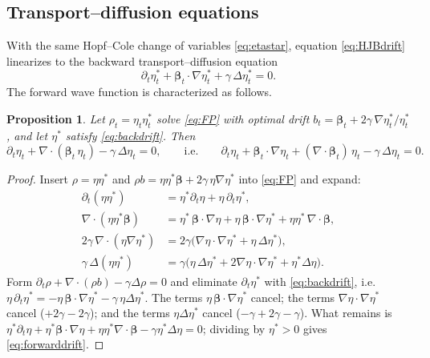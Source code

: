 \documentclass[11pt]{article}
\newtheorem{proposition}{Proposition}
\theoremstyle{remark}
\newcommand{\bt}{\boldsymbol{\beta}}
\newcommand{\grad}{\nabla}
\newcommand{\dive}{\grad\!\cdot\!}
\begin{document}
\subsection{Transport--diffusion equations}
With the same Hopf--Cole change of variables \eqref{eq:etastar}, equation
\eqref{eq:HJBdrift} linearizes to the backward transport--diffusion equation
\begin{equation}
\label{eq:backdrift}
\partial_t\eta^\ast_t+\bt_t\cdot\grad\eta^\ast_t+\gamma\,\Delta\eta^\ast_t=0 .
\end{equation}
The forward wave function is characterized as follows.

\begin{proposition}
\label{prop:forward}
Let $\rho_t=\eta_t\eta^\ast_t$ solve \eqref{eq:FP} with optimal drift
$b_t=\bt_t+2\gamma\,\grad\eta^\ast_t/\eta^\ast_t$, and let $\eta^\ast$ satisfy
\eqref{eq:backdrift}. Then
\begin{equation}
\label{eq:forwarddrift}
\partial_t\eta_t+\dive(\bt_t\,\eta_t)-\gamma\,\Delta\eta_t=0,
\qquad\text{i.e.}\qquad
\partial_t\eta_t+\bt_t\cdot\grad\eta_t+(\dive\bt_t)\,\eta_t-\gamma\,\Delta\eta_t=0 .
\end{equation}
\end{proposition}

\begin{proof}
Insert $\rho=\eta\eta^\ast$ and $\rho b=\eta\eta^\ast\bt+2\gamma\,\eta\grad\eta^\ast$
into \eqref{eq:FP} and expand:
\begin{align*}
\partial_t(\eta\eta^\ast)&=\eta^\ast\partial_t\eta+\eta\,\partial_t\eta^\ast,\\
\dive(\eta\eta^\ast\bt)&=\eta^\ast\,\bt\cdot\grad\eta+\eta\,\bt\cdot\grad\eta^\ast+\eta\eta^\ast\,\dive\bt,\\
2\gamma\,\dive(\eta\grad\eta^\ast)&=2\gamma\bigl(\grad\eta\cdot\grad\eta^\ast+\eta\,\Delta\eta^\ast\bigr),\\
\gamma\,\Delta(\eta\eta^\ast)&=\gamma\bigl(\eta\,\Delta\eta^\ast+2\grad\eta\cdot\grad\eta^\ast+\eta^\ast\Delta\eta\bigr).
\end{align*}
Form $\partial_t\rho+\dive(\rho b)-\gamma\Delta\rho=0$ and eliminate
$\partial_t\eta^\ast$ with \eqref{eq:backdrift}, i.e.
$\eta\,\partial_t\eta^\ast=-\eta\,\bt\cdot\grad\eta^\ast-\gamma\,\eta\Delta\eta^\ast$.
The terms $\eta\,\bt\cdot\grad\eta^\ast$ cancel; the terms
$\grad\eta\cdot\grad\eta^\ast$ cancel ($+2\gamma-2\gamma$); and the terms
$\eta\Delta\eta^\ast$ cancel ($-\gamma+2\gamma-\gamma$). What remains is
$\eta^\ast\partial_t\eta+\eta^\ast\bt\cdot\grad\eta+\eta\eta^\ast\dive\bt-\gamma\eta^\ast\Delta\eta=0$;
dividing by $\eta^\ast>0$ gives \eqref{eq:forwarddrift}.
\end{proof}
\end{document}

